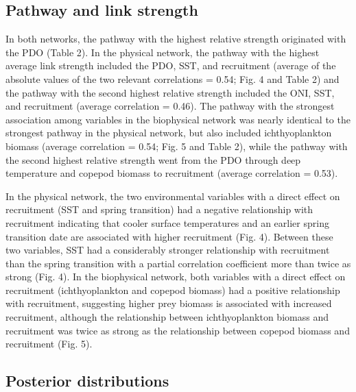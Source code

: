 \subsection{Pathway and link strength}

In both networks, the pathway with the highest relative strength originated with
the PDO (Table 2). In the physical network, the pathway with the highest average
link strength included the PDO, SST, and recruitment (average of the absolute
values of the two relevant correlations = 0.54; Fig. 4 and Table 2) and the
pathway with the second highest relative strength included the ONI, SST, and
recruitment (average correlation = 0.46). The pathway with the strongest
association among variables in the biophysical network was nearly identical to
the strongest pathway in the physical network, but also included ichthyoplankton
biomass (average correlation = 0.54; Fig. 5 and Table 2), while the pathway with
the second highest relative strength went from the PDO through deep temperature
and copepod biomass to recruitment (average correlation = 0.53).

In the physical network, the two environmental variables with a direct effect on
recruitment (SST and spring transition) had a negative relationship with
recruitment indicating that cooler surface temperatures and an earlier spring
transition date are associated with higher recruitment (Fig. 4). Between these
two variables, SST had a considerably stronger relationship with recruitment
than the spring transition with a partial correlation coefficient more than
twice as strong (Fig. 4). In the biophysical network, both variables with a
direct effect on recruitment (ichthyoplankton and copepod biomass) had a
positive relationship with recruitment, suggesting higher prey biomass is
associated with increased recruitment, although the relationship between
ichthyoplankton biomass and recruitment was twice as strong as the relationship
between copepod biomass and recruitment (Fig. 5).


\subsection{Posterior distributions}


